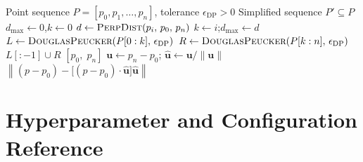 \documentclass[12pt, a4paper, oneside]{report}
\theoremstyle{definition}
\newcommand{\norm}[1]{\left\|#1\right\|}
\begin{document}
\begin{algorithm}[H]
\caption{Douglas--Peucker Path Simplification}
\label{alg:dp}
\begin{algorithmic}[1]
\Require Point sequence $P = [p_0, p_1, \ldots, p_n]$,
         tolerance $\epsilon_{\mathrm{DP}} > 0$
\Ensure Simplified sequence $P' \subseteq P$
  \State $d_{\max} \gets 0$,\quad $k \gets 0$
    \State $d \gets \Call{PerpDist}{p_i,\, p_0,\, p_n}$
      \State $k \gets i$;\quad $d_{\max} \gets d$
    \EndIf
  \EndFor
    \State $L \gets \Call{DouglasPeucker}{P[0:k],\,\epsilon_{\mathrm{DP}}}$
    \State $R \gets \Call{DouglasPeucker}{P[k:n],\,\epsilon_{\mathrm{DP}}}$
    \State \Return $L[:-1] \cup R$
  \Else
    \State \Return $[p_0,\; p_n]$
  \EndIf
\EndFunction
\Statex
{}
  \State $\mathbf{u} \gets p_n - p_0$;\quad
         $\hat{\mathbf{u}} \gets \mathbf{u}/\norm{\mathbf{u}}$
  \State \Return $\norm{(p - p_0) -
         \bigl[(p-p_0)\cdot\hat{\mathbf{u}}\bigr]\hat{\mathbf{u}}}$
\EndFunction
\end{algorithmic}
\end{algorithm}

\chapter{Hyperparameter and Configuration Reference}
\label{app:hyperparams}
\end{document}
